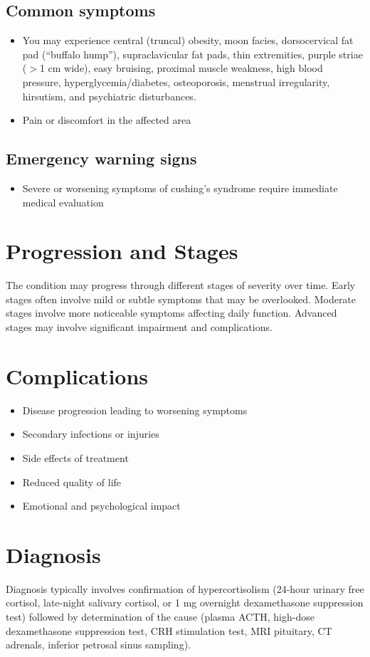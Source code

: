 \subsection{Common symptoms}
\begin{itemize}[noitemsep]
  \item You may experience central (truncal) obesity, moon facies, dorsocervical fat pad (``buffalo hump''), supraclavicular fat pads, thin extremities, purple striae ($>$1 cm wide), easy bruising, proximal muscle weakness, high blood pressure, hyperglycemia/diabetes, osteoporosis, menstrual irregularity, hirsutism, and psychiatric disturbances.
  \item Pain or discomfort in the affected area
  \end{itemize}

\subsection{Emergency warning signs}
\begin{itemize}[noitemsep]
  \item Severe or worsening symptoms of cushing's syndrome require immediate medical evaluation
\end{itemize}
\section{Progression and Stages}
The condition may progress through different stages of severity over time. Early stages often involve mild or subtle symptoms that may be overlooked. Moderate stages involve more noticeable symptoms affecting daily function. Advanced stages may involve significant impairment and complications.
\section{Complications}
\begin{itemize}[noitemsep]
  \item Disease progression leading to worsening symptoms
  \item Secondary infections or injuries
  \item Side effects of treatment
  \item Reduced quality of life
  \item Emotional and psychological impact
\end{itemize}
\section{Diagnosis}
Diagnosis typically involves confirmation of hypercortisolism (24-hour urinary free cortisol, late-night salivary cortisol, or 1 mg overnight dexamethasone suppression test) followed by determination of the cause (plasma ACTH, high-dose dexamethasone suppression test, CRH stimulation test, MRI pituitary, CT adrenals, inferior petrosal sinus sampling).

